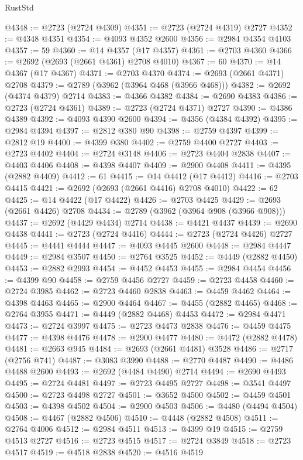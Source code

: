 \begin{lexlean}{RustStd}
\begin{coremodule}
@4348 := @2723 (@2724 @4309)
@4351 := @2723 (@2724 @4319) @2727
@4352 := @4348 @4351
@4354 := @4093 @4352 @2600
@4356 := @2984 @4354 @4103
@4357 := 59
@4360 := @14 @4357 (@17 @4357)
@4361 := @2703 @4360
@4366 := @2692 (@2693 (@2661 @4361) @2708 @4010)
@4367 := 60
@4370 := @14 @4367 (@17 @4367)
@4371 := @2703 @4370
@4374 := @2693 (@2661 @4371) @2708
@4379 := @2789 (@3962 (@3964 @468 (@3966 @468)))
@4382 := @2692 (@4374 @4379) @2714
@4383 := @4366 @4382
@4384 := @2690 @4383
@4386 := @2723 (@2724 @4361)
@4389 := @2723 (@2724 @4371) @2727
@4390 := @4386 @4389
@4392 := @4093 @4390 @2600
@4394 := @4356 (@4384 @4392)
@4395 := @2984 @4394
@4397 := @2812 @380 @90
@4398 := @2759 @4397
@4399 := @2812 @19
@4400 := @4399 @380
@4402 := @2759 @4400 @2727
@4403 := @2723 @4402
@4404 := @2724 @3148
@4406 := @2723 @4404 @2838
@4407 := @4403 @4406
@4408 := @4398 @4407
@4409 := @2900 @4408
@4411 := @4395 (@2882 @4409)
@4412 := 61
@4415 := @14 @4412 (@17 @4412)
@4416 := @2703 @4415
@4421 := @2692 (@2693 (@2661 @4416) @2708 @4010)
@4422 := 62
@4425 := @14 @4422 (@17 @4422)
@4426 := @2703 @4425
@4429 := @2693 (@2661 @4426) @2708
@4434 := @2789 (@3962 (@3964 @908 (@3966 @908)))
@4437 := @2692 (@4429 @4434) @2714
@4438 := @4421 @4437
@4439 := @2690 @4438
@4441 := @2723 (@2724 @4416)
@4444 := @2723 (@2724 @4426) @2727
@4445 := @4441 @4444
@4447 := @4093 @4445 @2600
@4448 := @2984 @4447
@4449 := @2984 @3507
@4450 := @2764 @3525
@4452 := @4449 (@2882 @4450)
@4453 := @2882 @2993
@4454 := @4452 @4453
@4455 := @2984 @4454
@4456 := @4399 @90
@4458 := @2759 @4456 @2727
@4459 := @2723 @4458
@4460 := @2724 @3985
@4462 := @2723 @4460 @2838
@4463 := @4459 @4462
@4464 := @4398 @4463
@4465 := @2900 @4464
@4467 := @4455 (@2882 @4465)
@4468 := @2764 @3955
@4471 := @4449 (@2882 @4468) @4453
@4472 := @2984 @4471
@4473 := @2724 @3997
@4475 := @2723 @4473 @2838
@4476 := @4459 @4475
@4477 := @4398 @4476
@4478 := @2900 @4477
@4480 := @4472 (@2882 @4478)
@4481 := @2663 @945
@4484 := @2693 (@2661 @4481) @3528
@4486 := @2717 (@2756 @741)
@4487 := @3083 @3990
@4488 := @2770 @4487
@4490 := @4486 @4488 @2600
@4493 := @2692 (@4484 @4490) @2714
@4494 := @2690 @4493
@4495 := @2724 @4481
@4497 := @2723 @4495 @2727
@4498 := @3541 @4497
@4500 := @2723 @4498 @2727
@4501 := @3652 @4500
@4502 := @4459 @4501
@4503 := @4398 @4502
@4504 := @2900 @4503
@4506 := @4480 (@4494 @4504)
@4508 := @4467 (@2882 @4506)
@4510 := @4448 (@2882 @4508)
@4511 := @2764 @4006
@4512 := @2984 @4511
@4513 := @4399 @19
@4515 := @2759 @4513 @2727
@4516 := @2723 @4515
@4517 := @2724 @3849
@4518 := @2723 @4517
@4519 := @4518 @2838
@4520 := @4516 @4519

\end{coremodule}
\end{lexlean}
